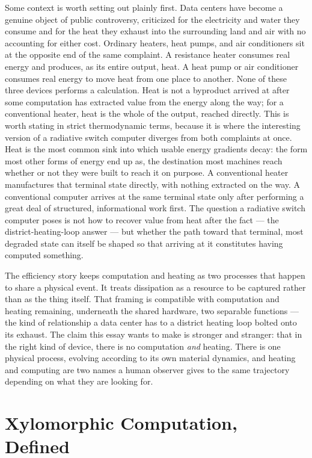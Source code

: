 \documentclass[11pt]{article}
\begin{document}
Some context is worth setting out plainly first. Data centers have become a genuine object of public controversy, criticized for the electricity and water they consume and for the heat they exhaust into the surrounding land and air with no accounting for either cost. Ordinary heaters, heat pumps, and air conditioners sit at the opposite end of the same complaint. A resistance heater consumes real energy and produces, as its entire output, heat. A heat pump or air conditioner consumes real energy to move heat from one place to another. None of these three devices performs a calculation. Heat is not a byproduct arrived at after some computation has extracted value from the energy along the way; for a conventional heater, heat is the whole of the output, reached directly. This is worth stating in strict thermodynamic terms, because it is where the interesting version of a radiative switch computer diverges from both complaints at once. Heat is the most common sink into which usable energy gradients decay: the form most other forms of energy end up as, the destination most machines reach whether or not they were built to reach it on purpose. A conventional heater manufactures that terminal state directly, with nothing extracted on the way. A conventional computer arrives at the same terminal state only after performing a great deal of structured, informational work first. The question a radiative switch computer poses is not how to recover value from heat after the fact --- the district-heating-loop answer --- but whether the path toward that terminal, most degraded state can itself be shaped so that arriving at it constitutes having computed something.

The efficiency story keeps computation and heating as two processes that happen to share a physical event. It treats dissipation as a resource to be captured rather than as the thing itself. That framing is compatible with computation and heating remaining, underneath the shared hardware, two separable functions --- the kind of relationship a data center has to a district heating loop bolted onto its exhaust. The claim this essay wants to make is stronger and stranger: that in the right kind of device, there is no computation \emph{and} heating. There is one physical process, evolving according to its own material dynamics, and heating and computing are two names a human observer gives to the same trajectory depending on what they are looking for.

\section{Xylomorphic Computation, Defined}
\end{document}
